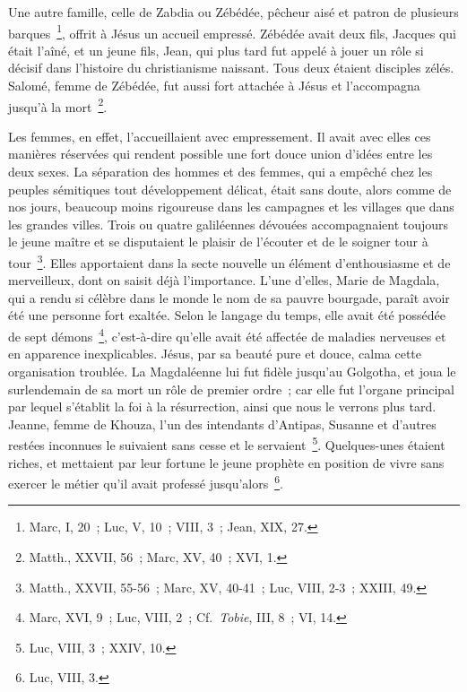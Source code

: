 \documentclass[french,twoside]{book} %
\begin{document}
Une autre famille, celle de Zabdia ou Zébédée, pêcheur aisé et patron de plusieurs barques \footnote{Marc, I, 20 ; Luc, V, 10 ; VIII, 3 ; Jean, XIX, 27.}, offrit à Jésus un accueil empressé. Zébédée avait deux fils, Jacques qui était l’aîné, et un jeune fils, Jean, qui plus tard fut appelé à jouer un rôle si décisif dans l’histoire du christianisme naissant. Tous deux étaient disciples zélés. Salomé, femme de Zébédée, fut aussi fort attachée à Jésus et l’accompagna jusqu’à la mort \footnote{Matth., XXVII, 56 ; Marc, XV, 40 ; XVI, 1.}.\par
Les femmes, en effet, l’accueillaient avec empressement. Il avait avec elles ces manières réservées qui rendent possible une fort douce union d’idées entre les deux sexes. La séparation des hommes et des femmes, qui a empêché chez les peuples sémitiques tout développement délicat, était sans doute, alors comme de nos jours, beaucoup moins rigoureuse dans les campagnes et les villages que dans les grandes villes. Trois ou quatre galiléennes dévouées accompagnaient toujours le jeune maître et se disputaient le plaisir de l’écouter et de le soigner tour à tour \footnote{Matth., XXVII, 55-56 ; Marc, XV, 40-41 ; Luc, VIII, 2-3 ; XXIII, 49.}. Elles apportaient dans la secte nouvelle un élément d’enthousiasme et de merveilleux, dont on saisit déjà l’importance. L’une d’elles, Marie de Magdala, qui a rendu si célèbre dans le monde le nom de sa pauvre bourgade, paraît avoir été une personne fort exaltée. Selon le langage du temps, elle avait été possédée de sept démons \footnote{ Marc, XVI, 9 ; Luc, VIII, 2 ; Cf. {\itshape Tobie}, III, 8 ; VI, 14.}, c’est-à-dire qu’elle avait été affectée de maladies nerveuses et en apparence inexplicables. Jésus, par sa beauté pure et douce, calma cette organisation troublée. La Magdaléenne lui fut fidèle jusqu’au Golgotha, et joua le surlendemain de sa mort un rôle de premier ordre ; car elle fut l’organe principal par lequel s’établit la foi à la résurrection, ainsi que nous le verrons plus tard. Jeanne, femme de Khouza, l’un des intendants d’Antipas, Susanne et d’autres restées inconnues le suivaient sans cesse et le servaient \footnote{Luc, VIII, 3 ; XXIV, 10.}. Quelques-unes étaient riches, et mettaient par leur fortune le jeune prophète en position de vivre sans exercer le métier qu’il avait professé jusqu’alors \footnote{Luc, VIII, 3.}.\par
\end{document}
